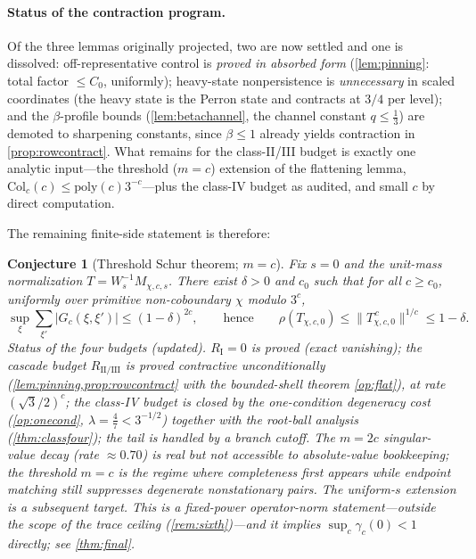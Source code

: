 \documentclass[11pt]{article}
\theoremstyle{plain}
\newtheorem{conjecture}{Conjecture}
\theoremstyle{definition}
\theoremstyle{remark}
\begin{document}
\paragraph{Status of the contraction program.} Of the three lemmas
originally projected, two are now settled and one is dissolved:
off-representative control is \emph{proved in absorbed form}
(\cref{lem:pinning}: total factor $\le C_0$, uniformly); heavy-state
nonpersistence is \emph{unnecessary} in scaled coordinates (the heavy
state is the Perron state and contracts at $3/4$ per level); and the
$\beta$-profile bounds (\cref{lem:betachannel}, the channel constant
$q\le\frac13$) are demoted to sharpening constants, since $\beta\le1$
already yields contraction in \cref{prop:rowcontract}. What remains for
the class-II/III budget is exactly one analytic input---the threshold
($m=c$) extension of the flattening lemma,
$\mathrm{Col}_c(c)\le\mathrm{poly}(c)3^{-c}$---plus the class-IV budget as
audited, and small $c$ by direct computation.

The remaining finite-side statement is therefore:

\begin{conjecture}[Threshold Schur theorem; $m=c$]\label{conj:schur}
Fix $s=0$ and the unit-mass normalization $T=W_s^{-1}M_{\chi,c,s}$. There
exist $\delta>0$ and $c_0$ such that for all $c\ge c_0$, uniformly over
primitive non-coboundary $\chi$ modulo $3^c$,
\[
\sup_{\xi}\sum_{\xi'}\bigl|G_c(\xi,\xi')\bigr|\le(1-\delta)^{2c},
\qquad\text{hence}\qquad
\rho(T_{\chi,c,0})\le\lVert T_{\chi,c,0}^{\,c}\rVert^{1/c}\le1-\delta.
\]
\emph{Status of the four budgets (updated).} $R_{\mathrm I}=0$ is proved
(exact vanishing); the cascade budget $R_{\mathrm{II/III}}$ is
\emph{proved} contractive unconditionally
(\cref{lem:pinning,prop:rowcontract} with the bounded-shell theorem
\cref{op:flat}), at rate $(\sqrt3/2)^c$; the class-IV budget is closed by the
one-condition degeneracy cost (\cref{op:onecond},
$\lambda=\frac47<3^{-1/2}$) together with the root-ball analysis
(\cref{thm:classfour}); the tail is handled by a branch cutoff. The
$m=2c$ singular-value decay (rate $\approx0.70$) is real but not
accessible to absolute-value bookkeeping; the threshold $m=c$ is the
regime where completeness first appears while endpoint matching still
suppresses degenerate nonstationary pairs. The uniform-$s$ extension is a
subsequent target. This is a fixed-power operator-norm statement---outside
the scope of the trace ceiling (\cref{rem:sixth})---and it implies
$\sup_c\gamma_c(0)<1$ directly; see \cref{thm:final}.
\end{conjecture}
\end{document}
